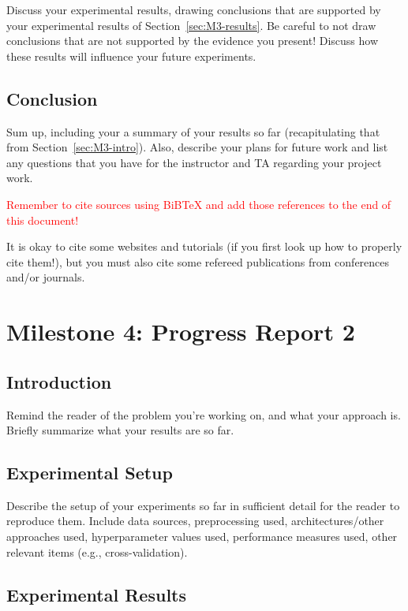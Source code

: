 \documentclass{report}
\begin{document}
Discuss your experimental results, drawing conclusions that are supported by your experimental results of Section~\ref{sec:M3-results}.  Be careful to not draw conclusions that are not supported by the evidence you present! Discuss how these results will influence your future experiments.

\section{Conclusion}

Sum up, including your a summary of your results so far (recapitulating that from Section~\ref{sec:M3-intro}).  Also, describe your plans for future work and list any questions that you have for the instructor and TA regarding your project work.

\textcolor{red}{Remember to cite sources using BiBTeX and add those references to the end of this document!}

It is okay to cite some websites and tutorials (if you first look up how to properly cite them!), but you must also cite some refereed publications from conferences and/or journals.


\chapter{Milestone 4: Progress Report 2}


\section{Introduction}
\label{sec:M4-intro}

Remind the reader of the problem you're working on, and what your approach is.  Briefly summarize what your results are so far.

\section{Experimental Setup}
\label{sec:M3-setup}

Describe the setup of your experiments so far in sufficient detail for the reader to reproduce them.  Include data sources, preprocessing used, architectures/other approaches used, hyperparameter values used, performance measures used, other relevant items (e.g., cross-validation).

\section{Experimental Results}
\label{sec:M4-results}
\end{document}
